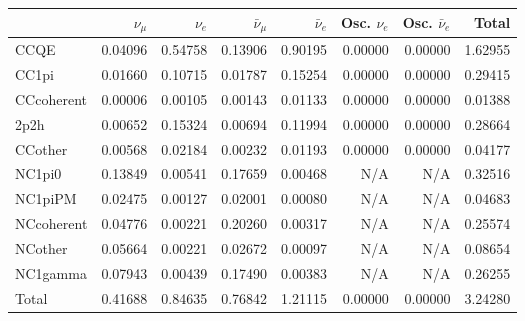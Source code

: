 \begin{tabular} { | l ||r | r | r | r | r | r | | r | }
\hline
              & $\nu_\mu$            & $\nu_e$              & $\bar{\nu}_{\mu}$    & $\bar{\nu}_{e}$      & Osc. $\nu_e$         & Osc. $\bar{\nu}_{e}$ & Total                \\ \hline\hline
 CCQE         & 0.04096              & 0.54758              & 0.13906              & 0.90195              & 0.00000              & 0.00000              & 1.62955              \\ \hline
 CC1pi        & 0.01660              & 0.10715              & 0.01787              & 0.15254              & 0.00000              & 0.00000              & 0.29415              \\ \hline
 CCcoherent   & 0.00006              & 0.00105              & 0.00143              & 0.01133              & 0.00000              & 0.00000              & 0.01388              \\ \hline
 2p2h         & 0.00652              & 0.15324              & 0.00694              & 0.11994              & 0.00000              & 0.00000              & 0.28664              \\ \hline
 CCother      & 0.00568              & 0.02184              & 0.00232              & 0.01193              & 0.00000              & 0.00000              & 0.04177              \\ \hline
 NC1pi0       & 0.13849              & 0.00541              & 0.17659              & 0.00468              & N/A                  & N/A                  & 0.32516              \\ \hline
 NC1piPM      & 0.02475              & 0.00127              & 0.02001              & 0.00080              & N/A                  & N/A                  & 0.04683              \\ \hline
 NCcoherent   & 0.04776              & 0.00221              & 0.20260              & 0.00317              & N/A                  & N/A                  & 0.25574              \\ \hline
 NCother      & 0.05664              & 0.00221              & 0.02672              & 0.00097              & N/A                  & N/A                  & 0.08654              \\ \hline
 NC1gamma     & 0.07943              & 0.00439              & 0.17490              & 0.00383              & N/A                  & N/A                  & 0.26255              \\ \hline
\hline
 Total        & 0.41688              & 0.84635              & 0.76842              & 1.21115              & 0.00000              & 0.00000              & 3.24280              \\ \hline

\end{tabular}
